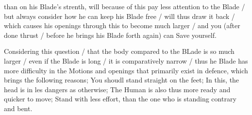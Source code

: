 \newpage


\newpage



than on his Blade's strenth, will because of this pay less attention
to the Blade / but always consider how he can keep his Blade free /
will thus draw it back / which causes his openings through this to
become much larger / and you (after done thrust / before he brings his
Blade forth again) can Save yourself.



Considering this question / that the body compared to the BLade is so
much larger / even if the Blade is long / it is comparatively narrow /
thus he Blade has more difficulty in the Motions and openings that
primarily exist in defence, which brings the following reasons; You
shoudl stand straight on the feet; In this, the head is in les dangers
as otherwise; The Human is also thus more ready and quicker to move;
Stand with less effort, than the one who is standing contrary and bent.



